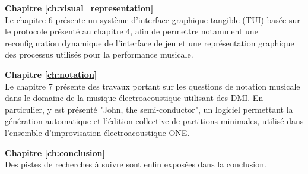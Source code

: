 \textbf{Chapitre \ref{ch:visual_representation}} \\[0.2em]
Le chapitre 6 présente un système d'interface graphique tangible (TUI) basée sur le protocole présenté au chapitre 4, afin de permettre notamment une reconfiguration dynamique de l'interface de jeu et une représentation graphique des processus utilisés pour la performance musicale.

\textbf{Chapitre \ref{ch:notation}} \\[0.2em]
Le chapitre 7 présente des travaux portant sur les questions de notation musicale dans le domaine de la musique électroacoustique utilisant des DMI. En particulier, y est présenté "John, the semi-conductor", un logiciel permettant la génération automatique et l'édition collective de partitions minimales, utilisé dans l'ensemble d'improvisation électroacoustique ONE.

\textbf{Chapitre \ref{ch:conclusion}} \\[0.2em]
Des pistes de recherches à suivre sont enfin exposées dans la conclusion.